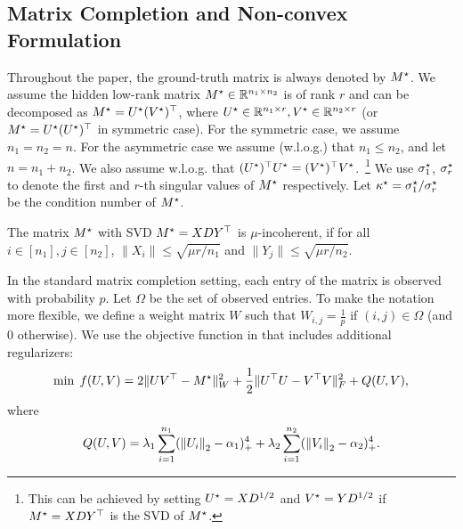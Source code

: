
\subsection{Matrix Completion and Non-convex Formulation}
\label{sec:matprelim}

Throughout the paper, the ground-truth matrix is always denoted by $M^\star$.
We assume the hidden low-rank matrix $M^\star\in \mathbb{R}^{n_1\times n_2}$ is of rank $r$ and can be decomposed as $M^\star=U^\star(V^\star)^\top$, where $U^\star \in \mathbb{R}^{n_1\times r}, V^\star\in\mathbb{R}^{n_2\times r}$ (or $M^\star = U^\star(U^\star)^\top$ in symmetric case).
For the symmetric case, we assume $n_1 = n_2 = n$. For the asymmetric case we assume (w.l.o.g.) that $n_1\le n_2$, and let $n = n_1+n_2$.
We also assume w.l.o.g. that $(U^\star)^\top U^\star=(V^\star)^\top V^\star$.~\footnote{This can be achieved by setting $U^\star = XD^{1/2}$ and $V^\star = YD^{1/2}$ if $M^\star =  XDY^\top$ is the SVD of $M^\star$.}
We use $\sigma^\star_1$, $\sigma^\star_r$ to denote the first and $r$-th singular values of $M^\star$ respectively. Let $\kappa^\star = \sigma^\star_1/\sigma^\star_r$ be the condition number of $M^\star$.

\begin{definition}[Incoherence]
The matrix $M^\star$ with SVD $M^\star = X D Y^\top$ is $\mu$-incoherent, if for all $i\in[n_1],j\in[n_2]$, $\|X_i\| \le \sqrt{\mu r/n_1}$ and $\|Y_j\| \le \sqrt{\mu r/n_2}$.
\end{definition}

In the standard matrix completion setting, each entry of the matrix is observed with probability $p$. Let $\Omega$ be the set of observed entries. %
%
To make the notation more flexible, we define a weight matrix $W$ such that $W_{i,j} = \frac{1}{p}$ if $(i,j)\in \Omega$ (and 0 otherwise).
We use the objective function in \citep{ge2016matrix,GeJZ17} that includes additional regularizers:
\begin{equation}
\min \; f(U, V) = 2\|UV^\top - M^\star\|_W^2 + \dfrac{1}{2} \|U^\top U-V^\top V\|_F^2 + Q(U,V),
\label{eqn:asymmetricobj}
\end{equation}
where
\[
Q(U,V) = \lambda_1 \sum_{i=1}^{n_1} ({\lVert U_i{\rVert}}_2 - \alpha_1)_+^4 +\lambda_2\sum_{i=1}^{n_2} ({\lVert V_i{\rVert}}_2 - \alpha_2)_+^4.
\]

